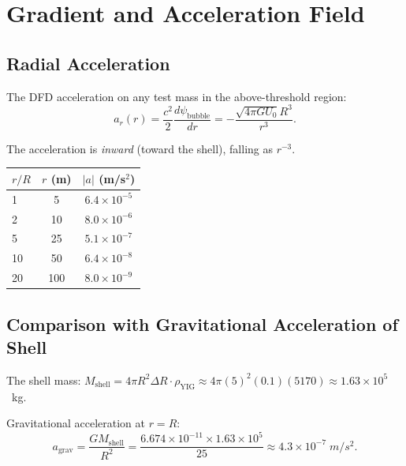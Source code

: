 \documentclass[amsmath,amssymb,aps,prd,superscriptaddress,nofootinbib]{revtex4-2}
\begin{document}
\section{Gradient and Acceleration Field}\label{sec:gradient}

\subsection{Radial Acceleration}

The DFD acceleration on any test mass in the above-threshold region:
\begin{equation}
a_r(r) = \frac{c^2}{2}\frac{d\psi_\text{bubble}}{dr} = -\frac{\sqrt{4\pi G U_0} R^3}{r^3}.
\end{equation}

The acceleration is \emph{inward} (toward the shell), falling as $r^{-3}$.

\begin{center}
\begin{tabular}{lcc}
\toprule
$r/R$ & $r$ (m) & $|a|$ (m/s$^2$) \\
\midrule
1 & 5 & $6.4 \times 10^{-5}$ \\
2 & 10 & $8.0 \times 10^{-6}$ \\
5 & 25 & $5.1 \times 10^{-7}$ \\
10 & 50 & $6.4 \times 10^{-8}$ \\
20 & 100 & $8.0 \times 10^{-9}$ \\
\bottomrule
\end{tabular}
\end{center}

\subsection{Comparison with Gravitational Acceleration of Shell}

The shell mass: $M_\text{shell} = 4\pi R^2 \Delta R \cdot \rho_\text{YIG}
\approx 4\pi (5)^2 (0.1)(5170) \approx 1.63 \times 10^5$~kg.

Gravitational acceleration at $r = R$:
\begin{equation}
a_\text{grav} = \frac{GM_\text{shell}}{R^2}
= \frac{6.674 \times 10^{-11} \times 1.63 \times 10^5}{25}
\approx 4.3 \times 10^{-7} \; \si{m/s^2}.
\end{equation}
\end{document}
